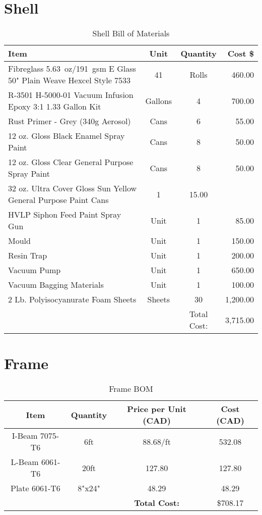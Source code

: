\documentclass[main.tex]{subfiles}
\begin{document}
\section{Shell}
\begin{table}[H]
\centering
  \begin{tabular}{@{}l c c r@{}} \toprule
    Item & Unit & Quantity & Cost \$ \\ \midrule
    Fibreglass \SI{5.63}{oz}/\SI{191}{gsm} E Glass 50" Plain Weave Hexcel Style 7533 & 41 & Rolls & 460.00 \\
    R-3501 H-5000-01 Vacuum Infusion Epoxy 3:1 1.33 Gallon Kit & Gallons & 4 & 700.00\\
    Rust Primer - Grey (340g Aerosol) & Cans & 6 & 55.00\\
    12 oz. Gloss Black Enamel Spray Paint & Cans & 8 & 50.00\\
    12 oz. Gloss Clear General Purpose Spray Paint & Cans & 8 & 50.00\\
    32 oz. Ultra Cover Gloss Sun Yellow General Purpose Paint Cans & 1 & 15.00\\
    HVLP Siphon Feed Paint Spray Gun & Unit & 1 & 85.00 \\
    Mould & Unit & 1 & 150.00 \\
    Resin Trap & Unit & 1 & 200.00 \\
    Vacuum Pump & Unit & 1 & 650.00 \\
    Vacuum Bagging Materials & Unit & 1 & 100.00 \\
    2 Lb. Polyisocyanurate Foam Sheets & Sheets & 30 & 1,200.00 \\
    \midrule
     & & Total Cost: & 3,715.00\\
     \bottomrule
  \end{tabular}
  \caption{Shell Bill of Materials}
  \label{table:shellmoney}
\end{table}
\section{Frame}
\begin{table}[H]
    \centering
    \begin{tabular}{cccc}

    \toprule

    Item & Quantity & Price per Unit (CAD) & Cost (CAD) \\
    \midrule

    I-Beam 7075-T6 & 6ft & 88.68/ft & 532.08\\
    L-Beam 6061-T6 & 20ft & 127.80 & 127.80\\
    Plate 6061-T6 & 8"x24" & 48.29 & 48.29\\

\midrule
 & & \textbf{Total Cost:} & \$708.17\\
    \bottomrule

	\end{tabular}
    \caption{Frame BOM}
    \label{table:frame-bom}
\end{table}
\end{document}

